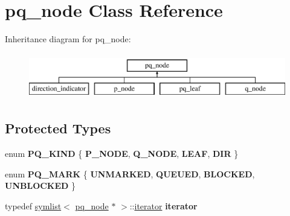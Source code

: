 \hypertarget{classpq__node}{}\section{pq\+\_\+node Class Reference}
\label{classpq__node}
Inheritance diagram for pq\+\_\+node\+:\begin{figure}[H]
\begin{center}
\leavevmode
\includegraphics[height=2.000000cm]{classpq__node}
\end{center}
\end{figure}
\subsection*{Protected Types}
\begin{DoxyCompactItemize}
\item 
\mbox{\label{classpq__node_a96827bdca8bf81d20213405dd27f8fa6}} 
enum {\bfseries P\+Q\+\_\+\+K\+I\+ND} \{ {\bfseries P\+\_\+\+N\+O\+DE}, 
{\bfseries Q\+\_\+\+N\+O\+DE}, 
{\bfseries L\+E\+AF}, 
{\bfseries D\+IR}
 \}
\item 
\mbox{\label{classpq__node_a6236b20cd5f6cc02cb5f637ed34c96d9}} 
enum {\bfseries P\+Q\+\_\+\+M\+A\+RK} \{ {\bfseries U\+N\+M\+A\+R\+K\+ED}, 
{\bfseries Q\+U\+E\+U\+ED}, 
{\bfseries B\+L\+O\+C\+K\+ED}, 
{\bfseries U\+N\+B\+L\+O\+C\+K\+ED}
 \}
\item 
\mbox{\label{classpq__node_a34898c9eb1527787c07e8ebefd6bfba5}} 
typedef \mbox{\hyperlink{classsymlist}{symlist}}$<$ \mbox{\hyperlink{classpq__node}{pq\+\_\+node}} $\ast$ $>$\+::\mbox{\hyperlink{structsymlist__iterator}{iterator}} {\bfseries iterator}
\end{DoxyCompactItemize}
